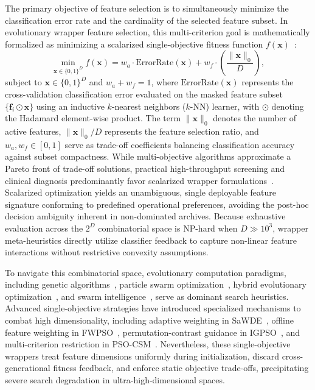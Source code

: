 \documentclass[final,5p,times,fleqn]{elsarticle}
\begin{document}
The primary objective of feature selection is to simultaneously minimize the classification error rate and the cardinality of the selected feature subset. In evolutionary wrapper feature selection, this multi-criterion goal is mathematically formalized as minimizing a scalarized single-objective fitness function $f(\mathbf{x})$~\cite{miao2024,deng2025nns}:
\begin{equation}
\min_{\mathbf{x} \in \{0, 1\}^D} f(\mathbf{x}) = w_a \cdot \mathrm{ErrorRate}(\mathbf{x}) + w_f \cdot \left(\frac{\|\mathbf{x}\|_0}{D}\right),
\label{eq:fs_formulation}
\end{equation}
subject to $\mathbf{x} \in \{0, 1\}^D$ and $w_a + w_f = 1$, where $\mathrm{ErrorRate}(\mathbf{x})$ represents the cross-validation classification error evaluated on the masked feature subset $\{\mathbf{f}_i \odot \mathbf{x}\}$ using an inductive $k$-nearest neighbors ($k\text{-NN}$) learner, with $\odot$ denoting the Hadamard element-wise product. The term $\|\mathbf{x}\|_0$ denotes the number of active features, $\|\mathbf{x}\|_0 / D$ represents the feature selection ratio, and $w_a, w_f \in [0, 1]$ serve as trade-off coefficients balancing classification accuracy against subset compactness. While multi-objective algorithms approximate a Pareto front of trade-off solutions, practical high-throughput screening and clinical diagnosis predominantly favor scalarized wrapper formulations~\cite{kohavi1997,miao2024}. Scalarized optimization yields an unambiguous, single deployable feature signature conforming to predefined operational preferences, avoiding the post-hoc decision ambiguity inherent in non-dominated archives. Because exhaustive evaluation across the $2^D$ combinatorial space is NP-hard when $D \gg 10^3$, wrapper meta-heuristics directly utilize classifier feedback to capture non-linear feature interactions without restrictive convexity assumptions.

To navigate this combinatorial space, evolutionary computation paradigms, including genetic algorithms~\cite{bohrer2024}, particle swarm optimization~\cite{li2023}, hybrid evolutionary optimization~\cite{xue2023asoc}, and swarm intelligence~\cite{xue2016survey,liang2025,cheng2023}, serve as dominant search heuristics. Advanced single-objective strategies have introduced specialized mechanisms to combat high dimensionality, including adaptive weighting in SaWDE~\cite{wang2022}, offline feature weighting in FWPSO~\cite{wangjia2022}, permutation-contrast guidance in IGPSO~\cite{xuezhang2024}, and multi-criterion restriction in PSO-CSM~\cite{wei2025}. Nevertheless, these single-objective wrappers treat feature dimensions uniformly during initialization, discard cross-generational fitness feedback, and enforce static objective trade-offs, precipitating severe search degradation in ultra-high-dimensional spaces.
\end{document}
